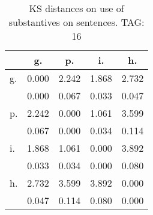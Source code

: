 \begin{table}[h!]
\begin{center}
\begin{tabular}{| l | c | c | c | c |}\hline
 & g. & p. & i. & h. \\\hline
g. & 0.000  & 2.242  & 1.868  & 2.732 \\\hline
 & 0.000  & 0.067  & 0.033  & 0.047 \\\hline
p. & 2.242  & 0.000  & 1.061  & 3.599 \\\hline
 & 0.067  & 0.000  & 0.034  & 0.114 \\\hline
i. & 1.868  & 1.061  & 0.000  & 3.892 \\\hline
 & 0.033  & 0.034  & 0.000  & 0.080 \\\hline
h. & 2.732  & 3.599  & 3.892  & 0.000 \\\hline
 & 0.047  & 0.114  & 0.080  & 0.000 \\\hline
\end{tabular}
\caption{KS distances on use of substantives on sentences. TAG: 16}
\end{center}
\end{table}